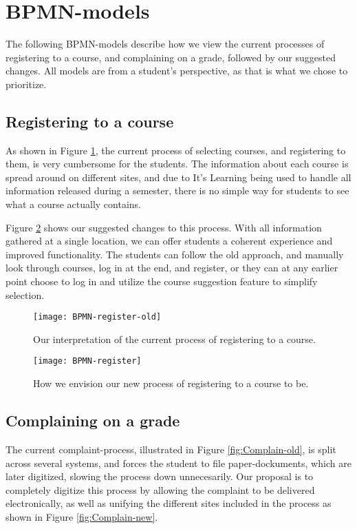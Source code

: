 \section{BPMN-models}
	The following BPMN-models\cite{bpmn} describe how we view the current processes of registering to a course, and complaining on a grade, followed by our suggested changes.
All models are from a student's perspective, as that is what we chose to prioritize.

\subsection{Registering to a course}
	As shown in Figure \ref{fig:Register-old}, the current process of selecting courses, and registering to them, is very cumbersome for the students.
The information about each course is spread around on different sites, and due to It's Learning being used to handle all information released during a semester,
there is no simple way for students to see what a course actually contains.

Figure \ref{fig:Register-new} shows our suggested changes to this process.
With all information gathered at a single location, we can offer students a coherent experience and improved functionality.
The students can follow the old approach, and manually look through courses, log in at the end, and register,
or they can at any earlier point choose to log in and utilize the course suggestion feature to simplify selection.
\begin{figure}[H]
    \centering
    \texttt{[image: BPMN-register-old]}%
    \caption{Our interpretation of the current process of registering to a course.}
    \label{fig:Register-old}
\end{figure}

\begin{figure}[H]
    \centering
    \texttt{[image: BPMN-register]}
    \caption{How we envision our new process of registering to a course to be.}
    \label{fig:Register-new}
\end{figure}

\subsection{Complaining on a grade}
	The current complaint-process, illustrated in Figure \ref{fig:Complain-old}, is split across several systems, and forces the student to file paper-dockuments,
which are later digitized, slowing the process down unnecesarily. Our proposal is to completely digitize this process  by allowing the complaint to be delivered electronically,
as well as unifying  the different sites included in the process as shown in Figure \ref{fig:Complain-new}.

